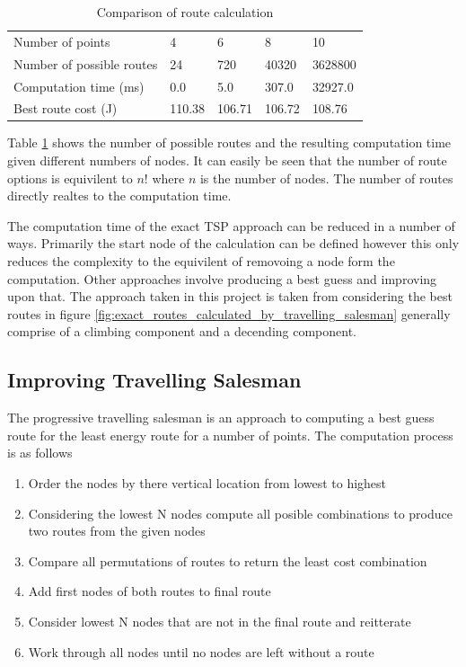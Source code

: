 \documentclass[a4paper,12pt,twoside]{article}
\begin{document}
\begin{table}[width=\textwidth]
\centering
    \begin{tabular}{lllll}
    Number of points	& 4	& 6	& 8	& 10	\\
Number of possible routes	& 24	& 720	& 40320	& 3628800	\\
Computation time (ms)	& 0.0	& 5.0	& 307.0	& 32927.0	\\
Best route cost (J)	& 110.38	& 106.71	& 106.72	& 108.76	\\

    \end{tabular}
\caption{Comparison of route calculation}
\label{tbl:comparison_of_route_calculation}
\end{table}

Table \ref{tbl:comparison_of_route_calculation} shows the number of possible routes and the resulting computation time given different numbers of nodes. It can easily be seen that the number of route options is equivilent to $n!$ where $n$ is the number of nodes. The number of routes directly realtes to the computation time.

The computation time of the exact TSP approach can be reduced in a number of ways. Primarily the start node of the calculation can be defined however this only reduces the complexity to the equivilent of removoing a node form the computation. Other approaches involve producing a best guess and improving upon that. The approach taken in this project is taken from considering the best routes in figure \ref{fig:exact_routes_calculated_by_travelling_salesman} generally comprise of a climbing component and a decending component.

\subsection{Improving Travelling Salesman}
\label{sec:improving_travelling_salesman}

The progressive travelling salesman is an approach to computing a best guess route for the least energy route for a number of points. The computation process is as follows

\begin{enumerate}
\item Order the nodes by there vertical location from lowest to highest
\item Considering the lowest N nodes compute all posible combinations to produce two routes from the given nodes
\item Compare all permutations of routes to return the least cost combination
\item Add first nodes of both routes to final route
\item Consider lowest N nodes that are not in the final route and reitterate
\item Work through all nodes until no nodes are left without a route

\end{enumerate}
\end{document}
